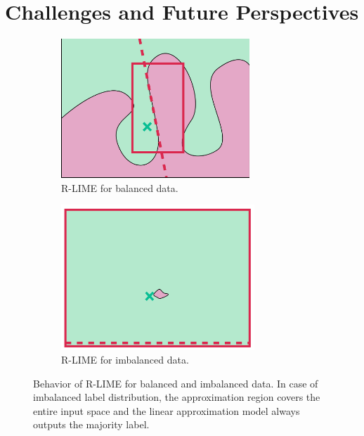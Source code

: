 \documentclass[runningheads]{llncs}
\begin{document}
\section{Challenges and Future Perspectives}
 {%
  \def\imgwidth{0.49\textwidth}
  \begin{figure}[t]
	  \centering
	  \begin{subfigure}[t]{\imgwidth}
		  \centering
		  \includegraphics[width=0.78\textwidth]{newlime}
		  \caption{R-LIME for balanced data.}\label{fig:balanced}
	  \end{subfigure}
	  \begin{subfigure}[t]{\imgwidth}
		  \centering
		  \includegraphics[width=0.8\textwidth]{newlime_for_imbalanced_data}
		  \caption{R-LIME for imbalanced data.
		  }\label{fig:imbalanced}
	  \end{subfigure}
	  \caption{%
		  Behavior of R-LIME for balanced and imbalanced data.
		  In case of imbalanced label distribution,
		  the approximation region covers the entire input space and the
		  linear approximation model always outputs the majority label.
	  }
	  \vspace{10pt}
  \end{figure}
 }
\end{document}
